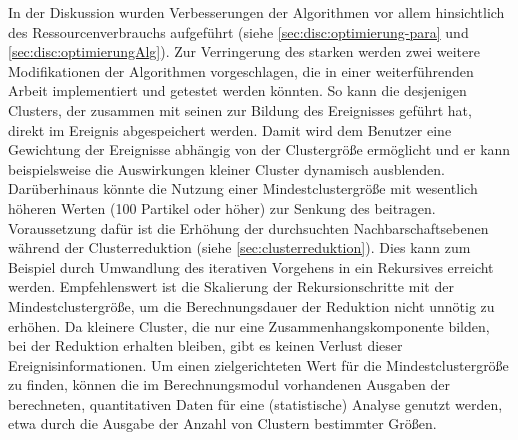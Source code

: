 In der Diskussion wurden Verbesserungen der Algorithmen vor allem hinsichtlich des Ressourcenverbrauchs aufgeführt (siehe \autoref{sec:disc:optimierung-para} und \autoref{sec:disc:optimierungAlg}). Zur Verringerung des starken  werden zwei weitere Modifikationen der Algorithmen vorgeschlagen, die in einer weiterführenden Arbeit implementiert und getestet werden könnten. So kann die  desjenigen Clusters, der zusammen mit seinen  zur Bildung des Ereignisses geführt hat, direkt im Ereignis abgespeichert werden. Damit wird dem Benutzer eine Gewichtung der Ereignisse abhängig von der Clustergröße ermöglicht und er kann beispielsweise die Auswirkungen kleiner Cluster dynamisch ausblenden.
Darüberhinaus könnte die Nutzung einer Mindestclustergröße mit wesentlich höheren Werten (100 Partikel oder höher) zur Senkung des  beitragen. Voraussetzung dafür ist die Erhöhung der durchsuchten Nachbarschaftsebenen während der Clusterreduktion (siehe \autoref{sec:clusterreduktion}). Dies kann zum Beispiel durch Umwandlung des iterativen Vorgehens in ein Rekursives erreicht werden. Empfehlenswert ist die Skalierung der Rekursionschritte mit der Mindestclustergröße, um die Berechnungsdauer der Reduktion nicht unnötig zu erhöhen. Da kleinere Cluster, die nur eine Zusammenhangskomponente bilden, bei der Reduktion erhalten bleiben, gibt es keinen Verlust dieser Ereignisinformationen.
Um einen zielgerichteten Wert für die Mindestclustergröße zu finden, können die im Berechnungsmodul vorhandenen Ausgaben der berechneten, quantitativen Daten für eine (statistische) Analyse genutzt werden, etwa durch die Ausgabe der Anzahl von Clustern bestimmter Größen.


